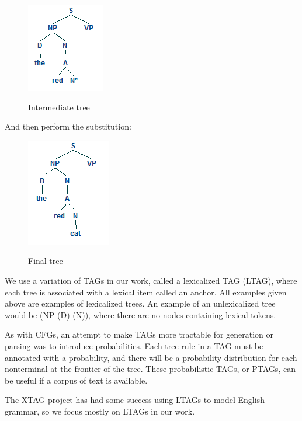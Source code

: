 \begin{figure}
\centering
\caption{Intermediate tree}
\includegraphics{tree-2.png}
\label{tree-2}
\end{figure}

And then perform the substitution:

\begin{figure}
\centering
\caption{Final tree}
\includegraphics{tree-3.png}
\label{tree-3}
\end{figure}

We use a variation of TAGs in our work, called a lexicalized TAG (LTAG), where each tree is
associated with a lexical item called an anchor.  All examples given above are examples of
lexicalized trees.  An example of an unlexicalized tree would be (NP (D) (N)), where there
are no nodes containing lexical tokens.

As with CFGs, an attempt to make TAGs more tractable for generation or parsing was to
introduce probabilities.  Each tree rule in a TAG must be annotated with a probability, and
there will be a probability distribution for each nonterminal at the frontier of the tree.
These probabilistic TAGs, or PTAGs, can be useful if a corpus of text is available.

The XTAG project has had some success using LTAGs to model English grammar, 
so we focus mostly on LTAGs in our work.